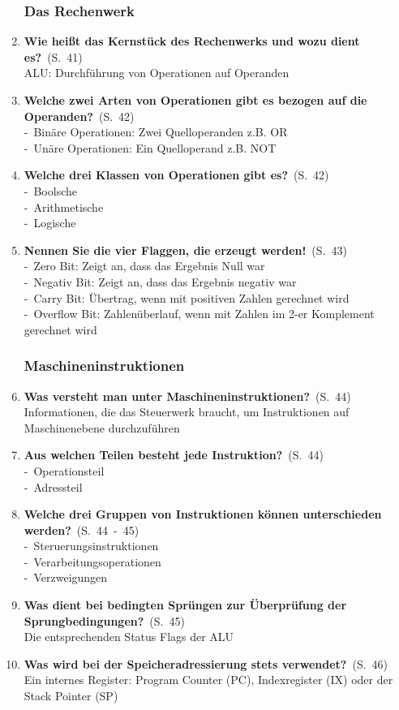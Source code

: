 \documentclass[a4paper,12pt]{article}
\newcommand{\question}[3]{\pagebreak[3]\item {\textbf{#1?}}\ (S.\ #2)#3}
\newcommand{\statement}[3]{\pagebreak[3]\item {\textbf{#1!}}\ (S.\ #2)#3}
\newcommand{\catchword}[1]{\\-\ #1}
\newcommand{\normaltext}[1]{\\#1}
\newcommand{\page}[1]{#1}
\newcommand{\pages}[2]{#1\ -\ #2}
\begin{document}
\begin{enumerate}
  \subsubsection{Das Rechenwerk}

  \question{Wie heißt das Kernstück des Rechenwerks und wozu dient es}{\page{41}}
  {
    \normaltext{ALU: Durchführung von Operationen auf Operanden}
  }

  \question{Welche zwei Arten von Operationen gibt es bezogen auf die Operanden}{\page{42}}
  {
    \catchword{Binäre Operationen: Zwei Quelloperanden z.B. OR}
    \catchword{Unäre Operationen: Ein Quelloperand z.B. NOT}
  }

  \question{Welche drei Klassen von Operationen gibt es}{\page{42}}
  {
    \catchword{Boolsche}
    \catchword{Arithmetische}
    \catchword{Logische}
  }

  \statement{Nennen Sie die vier Flaggen, die erzeugt werden}{\page{43}}
  {
    \catchword{Zero Bit: Zeigt an, dass das Ergebnis Null war}
    \catchword{Negativ Bit: Zeigt an, dass das Ergebnis negativ war}
    \catchword{Carry Bit: Übertrag, wenn mit positiven Zahlen gerechnet wird}
    \catchword{Overflow Bit: Zahlenüberlauf, wenn mit Zahlen im 2-er Komplement gerechnet wird}
  }

  \subsubsection{Maschineninstruktionen}

  \question{Was versteht man unter Maschineninstruktionen}{\page{44}}
  {
    \normaltext{Informationen, die das Steuerwerk braucht, um Instruktionen auf
                Maschinenebene durchzuführen}
  }

  \question{Aus welchen Teilen besteht jede Instruktion}{\page{44}}
  {
    \catchword{Operationsteil}
    \catchword{Adressteil}
  }

  \question{Welche drei Gruppen von Instruktionen können unterschieden werden}{\pages{44}{45}}
  {
    \catchword{Steruerungsinstruktionen}
    \catchword{Verarbeitungsoperationen}
    \catchword{Verzweigungen}
  }

  \question{Was dient bei bedingten Sprüngen zur Überprüfung der Sprungbedingungen}{\page{45}}
  {
    \normaltext{Die entsprechenden Status Flags der ALU}
  }

  \question{Was wird bei der Speicheradressierung stets verwendet}{\page{46}}
  {
    \normaltext{Ein internes Register: Program Counter (PC), Indexregister (IX)
                oder der Stack Pointer (SP)}
  }


\end{enumerate}
\end{document}
